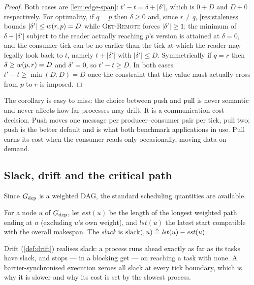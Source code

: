 \begin{proof}
Both cases are \cref{lem:edge-span}: $t' - t = \delta + |\delta'|$, which is
$0 + D$ and $D + 0$ respectively. For optimality, if $q = p$ then
$\delta \ge 0$ and, since $r \ne q$, \cref{res:staleness} bounds
$|\delta'| \le w(r,p) = D$ while \textsc{Get-Remote} forces
$|\delta'| \ge 1$; the minimum of $\delta + |\delta'|$ subject to the reader
actually reaching $p$'s version is attained at $\delta = 0$, and the consumer
tick can be no earlier than the tick at which the reader may legally look back
to $t$, namely $t + |\delta'|$ with $|\delta'| \le D$. Symmetrically if
$q = r$ then $\delta \ge w(p,r) = D$ and $\delta' = 0$, so
$t' - t \ge D$. In both cases $t' - t \ge \min(D, D) = D$ once the constraint
that the value must actually cross from $p$ to $r$ is imposed.
\end{proof}

\begin{remark}
The corollary is easy to miss: the choice between push and pull is never
semantic and never affects how far processes may drift. It is a
communication-cost decision. Push moves one message per producer--consumer
pair per tick, pull two; push is the better default and is what both benchmark
applications in \cite{dstm2026} use. Pull earns its cost when the consumer
reads only occasionally, moving data on demand.
\end{remark}

\subsection{Slack, drift and the critical path}
\label{sec:sync-slack}

Since $G_{\mathrm{dep}}$ is a weighted DAG, the standard scheduling quantities are
available.

\begin{definition}\label{def:slack}
For a node $u$ of $G_{\mathrm{dep}}$, let $\mathit{est}(u)$ be the length of the
longest weighted path ending at $u$ (excluding $u$'s own weight), and
$\mathit{lst}(u)$ the latest start compatible with the overall makespan. The
\emph{slack} is $\mathrm{slack}(,u) \triangleq \mathit{lst}(u) - \mathit{est}(u)$.
\end{definition}

Drift (\cref{def:drift}) realises slack: a process runs ahead exactly as far
as its tasks have slack, and stops --- in a blocking get --- on reaching a
task with none. A barrier-synchronised execution zeroes all slack at every
tick boundary, which is why it is slower and why its cost is set by the
slowest process.

